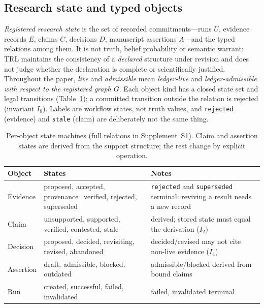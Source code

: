\documentclass[cmc,article,submit,moreauthors,pdftex]{Definitions/tsp}
\newcommand{\suppl}[1]{Supplement~#1}
\begin{document}
\subsection{Research state and typed objects}
\label{sec:states}
\emph{Registered research state} is the set of recorded commitments---runs $U$, evidence records $E$, claims $C$, decisions $D$, manuscript assertions $A$---and the typed relations among them. It is not truth, belief probability or semantic warrant: TRL maintains the consistency of a \emph{declared} structure under revision and does not judge whether the declaration is complete or scientifically justified. Throughout the paper, \emph{live} and \emph{admissible} mean \emph{ledger-live} and \emph{ledger-admissible with respect to the registered graph $G$}. Each object kind has a closed state set and legal transitions (Table~\ref{tab:states}); a committed transition outside the relation is rejected (invariant $I_8$). Labels are workflow states, not truth values, and \texttt{rejected} (evidence) and \texttt{stale} (claim) are deliberately not the same thing.

\begin{table}[t]
\centering
\caption{Per-object state machines (full relations in \suppl{S1}). Claim and assertion states are derived from the support structure; the rest change by explicit operation.}
\label{tab:states}
\scriptsize
\begin{tabularx}{\columnwidth}{l>{\raggedright\arraybackslash}X>{\raggedright\arraybackslash}X}
\toprule
Object & States & Notes \\
\midrule
Evidence & proposed, accepted, provenance\_verified, rejected, superseded & \texttt{rejected} and \texttt{superseded} terminal: reviving a result needs a new record \\
Claim & unsupported, supported, verified, contested, stale & derived; stored state must equal the derivation ($I_2$) \\
Decision & proposed, decided, revisiting, revised, abandoned & decided/revised may not cite non-live evidence ($I_4$) \\
Assertion & draft, admissible, blocked, outdated & admissible/blocked derived from bound claims \\
Run & created, successful, failed, invalidated & failed, invalidated terminal \\
\bottomrule
\end{tabularx}
\end{table}
\end{document}
